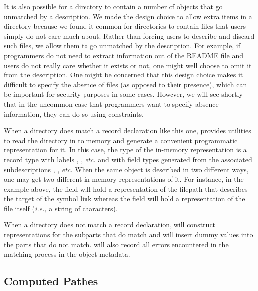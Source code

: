 \documentclass[natbib]{sigplanconf}
\begin{document}
It is also possible for a directory to contain a number of objects that go unmatched by
a description.  We made the design choice to allow extra items in
a directory because we found it common for directories to contain files that users
simply do not care much about.  Rather than forcing users to describe and discard such
files, we allow them to go unmatched by the description.  For example,
if programmers do not need to extract information out of the README file and
users do not really care whether it exists or not, one might well choose
to omit it from the description.  One might be concerned that this design choice makes it difficult to specify
the absence of files (as opposed to their presence), which can be important
for security purposes in some cases.  However, we will see shortly that in the
uncommon case that programmers want to specify absence information, they can
do so using constraints.

When a directory does match a record declaration like this one, 
\forest{} provides utilities to read the directory in
to memory and generate a convenient programmatic representation for it.  
In this case, the type of the in-memory representation is a record type
with labels , , {\em etc.} and with field types
generated from the associated \forest{} subdescriptions , ,
{\em etc.}  When the same object is described in two different ways, one may
get two different in-memory representations of it.  For instance, in the example above,
the  field will hold a representation of the filepath that describes the target of the
symbol link whereas the  field will hold a representation of the 
file itself ({\em i.e.,} a string of characters).

When a directory does not match a record declaration, \forest{} will
construct representations for the subparts that do match and will insert dummy values
into the parts that do not match.  \forest{} will also record all errors encountered in the
matching process in the object metadata.

\subsection{Computed Pathes}
\label{sec:computed-pathes}
\end{document}
